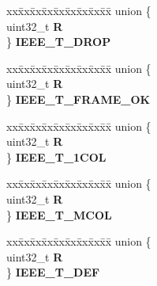 \begin{DoxyCompactItemize}
\begin{tabbing}
\end{tabbing}\item 
\mbox{\label{structFEC__tag_a016e8448d2121b1b24d64d2b8485a352}} 
\begin{tabbing}
xx\=xx\=xx\=xx\=xx\=xx\=xx\=xx\=xx\=\kill
union \{\\
\>uint32\_t {\bfseries R}\\
\} {\bfseries IEEE\_T\_DROP}\\

\end{tabbing}\item 
\mbox{\label{structFEC__tag_aa81cc49b7f0ab087a62432ae05a33c8b}} 
\begin{tabbing}
xx\=xx\=xx\=xx\=xx\=xx\=xx\=xx\=xx\=\kill
union \{\\
\>uint32\_t {\bfseries R}\\
\} {\bfseries IEEE\_T\_FRAME\_OK}\\

\end{tabbing}\item 
\mbox{\label{structFEC__tag_abe2d3ee53e2b483ea8e3b55e8539cde2}} 
\begin{tabbing}
xx\=xx\=xx\=xx\=xx\=xx\=xx\=xx\=xx\=\kill
union \{\\
\>uint32\_t {\bfseries R}\\
\} {\bfseries IEEE\_T\_1COL}\\

\end{tabbing}\item 
\mbox{\label{structFEC__tag_ad8264eade272c2569b30ec3bd3471ad3}} 
\begin{tabbing}
xx\=xx\=xx\=xx\=xx\=xx\=xx\=xx\=xx\=\kill
union \{\\
\>uint32\_t {\bfseries R}\\
\} {\bfseries IEEE\_T\_MCOL}\\

\end{tabbing}\item 
\mbox{\label{structFEC__tag_a1707252bf9c5b5695b093d3f38837bc5}} 
\begin{tabbing}
xx\=xx\=xx\=xx\=xx\=xx\=xx\=xx\=xx\=\kill
union \{\\
\>uint32\_t {\bfseries R}\\
\} {\bfseries IEEE\_T\_DEF}\\


\end{tabbing}
\end{DoxyCompactItemize}
